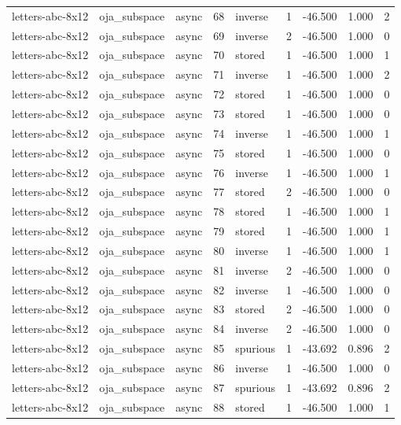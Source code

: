 \begin{tabular}{lllrlrrrr}
letters-abc-8x12 & oja\_subspace & async & 68 & inverse & 1 & -46.500 & 1.000 & 2 \\
letters-abc-8x12 & oja\_subspace & async & 69 & inverse & 2 & -46.500 & 1.000 & 0 \\
letters-abc-8x12 & oja\_subspace & async & 70 & stored & 1 & -46.500 & 1.000 & 1 \\
letters-abc-8x12 & oja\_subspace & async & 71 & inverse & 1 & -46.500 & 1.000 & 2 \\
letters-abc-8x12 & oja\_subspace & async & 72 & stored & 1 & -46.500 & 1.000 & 0 \\
letters-abc-8x12 & oja\_subspace & async & 73 & stored & 1 & -46.500 & 1.000 & 0 \\
letters-abc-8x12 & oja\_subspace & async & 74 & inverse & 1 & -46.500 & 1.000 & 1 \\
letters-abc-8x12 & oja\_subspace & async & 75 & stored & 1 & -46.500 & 1.000 & 0 \\
letters-abc-8x12 & oja\_subspace & async & 76 & inverse & 1 & -46.500 & 1.000 & 1 \\
letters-abc-8x12 & oja\_subspace & async & 77 & stored & 2 & -46.500 & 1.000 & 0 \\
letters-abc-8x12 & oja\_subspace & async & 78 & stored & 1 & -46.500 & 1.000 & 1 \\
letters-abc-8x12 & oja\_subspace & async & 79 & stored & 1 & -46.500 & 1.000 & 1 \\
letters-abc-8x12 & oja\_subspace & async & 80 & inverse & 1 & -46.500 & 1.000 & 1 \\
letters-abc-8x12 & oja\_subspace & async & 81 & inverse & 2 & -46.500 & 1.000 & 0 \\
letters-abc-8x12 & oja\_subspace & async & 82 & inverse & 1 & -46.500 & 1.000 & 0 \\
letters-abc-8x12 & oja\_subspace & async & 83 & stored & 2 & -46.500 & 1.000 & 0 \\
letters-abc-8x12 & oja\_subspace & async & 84 & inverse & 2 & -46.500 & 1.000 & 0 \\
letters-abc-8x12 & oja\_subspace & async & 85 & spurious & 1 & -43.692 & 0.896 & 2 \\
letters-abc-8x12 & oja\_subspace & async & 86 & inverse & 1 & -46.500 & 1.000 & 0 \\
letters-abc-8x12 & oja\_subspace & async & 87 & spurious & 1 & -43.692 & 0.896 & 2 \\
letters-abc-8x12 & oja\_subspace & async & 88 & stored & 1 & -46.500 & 1.000 & 1 \\

\end{tabular}
